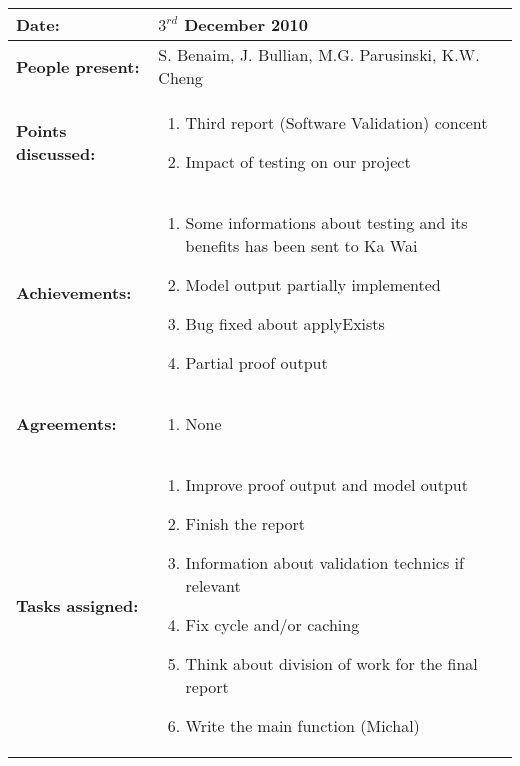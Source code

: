 \documentclass[12pt,a4paper]{article}
\newcommand{\meeting}[6]{%
\begin{center}%
\begin{longtable}{| p{3.5cm} | | p{13cm} |}%
\hline%
\textbf{Date:} & #1 \\%
\hline%
\textbf{People present:} &#2 \\%
\hline%
\textbf{Points discussed:} &#3\\%
\hline%
\textbf{Achievements:} &#4 \\%
\hline%
\textbf{Agreements:} &#5 \\%
\hline%
\textbf{Tasks assigned:} &#6  \\%
\hline%
\end{longtable}%
\end{center}%
\bigbreak
}
\begin{document}
\meeting{$3^{rd}$ December 2010}%
{S. Benaim, J. Bullian, M.G. Parusinski, K.W. Cheng}%
{\begin{enumerate}
\item Third report (Software Validation) concent
\item Impact of testing on our project
\end{enumerate}
}%
{\begin{enumerate}
\item Some informations about testing and its benefits has been sent to Ka Wai
\item Model output partially implemented
\item Bug fixed about applyExists
\item Partial proof output
\end{enumerate}
}%
{\begin{enumerate}
\item None
\end{enumerate}
}
{\begin{enumerate}
\item Improve proof output and model output
\item Finish the report
\item Information about validation technics if relevant
\item Fix cycle and/or caching
\item Think about division of work for the final report
\item Write the main function (Michal)
\end{enumerate}}%
\end{document}
